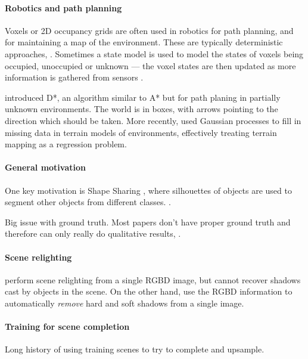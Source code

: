 \documentclass[10pt,twocolumn,letterpaper]{article}
\begin{document}
\paragraph{Robotics and path planning}
Voxels or 2D occupancy grids are often used in robotics for path planning, and for maintaining a map of the environment. 
These are typically deterministic approaches, \eg \cite{jetchev-icra-2010}. Sometimes a state model is used to model the states of voxels being occupied, unoccupied or unknown --- the voxel states are then updated as more information is gathered from sensors \cite{toussaint-techreport-2007}.

\cite{stentz-icra-1994} introduced D*, an algorithm similar to A* but for path planing in partially unknown environments. 
The world is in boxes, with arrows pointing to the direction which should be taken.
More recently, \cite{plagemann-iros-2008} used Gaussian processes to fill in missing data in terrain models of environments, effectively treating terrain mapping as a regression problem.

\paragraph{General motivation}
One key motivation is Shape Sharing \cite{kim-eccv-2012}, where silhouettes of objects are used to segment other objects from different classes.
 \cite{nan-acm-2012}.

Big issue with ground truth. Most papers don't have proper ground truth and therefore can only really do qualitative results, \eg \cite{all the papers...}.

\paragraph{Scene relighting}
\cite{ikeda-acpr-2013} perform scene relighting from a single RGBD image, but cannot recover shadows cast by objects in the scene.
On the other hand, \cite{xiao-cvpr-2014} use the RGBD information to automatically \textit{remove} hard and soft shadows from a single image.

\paragraph{Training for scene completion}
Long history of using training scenes to try to complete and upsample.
\end{document}

